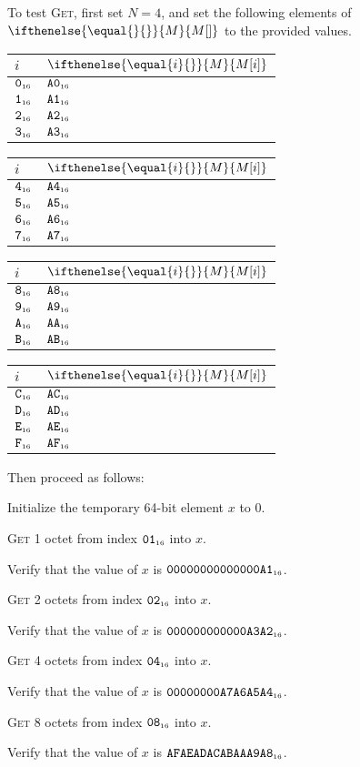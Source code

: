 \documentclass[a4paper,12pt]{article}
\makeatletter
\newcommand{\num}[1]{\texttt{#1}}
\newcommand{\hex}[1]{\num{#1}_{\textup{\tiny 16}}}
\newcommand{\MEM}[1]{\ifthenelse{\equal{#1}{}}{M}{M[#1]}}
\newcommand{\proc}[1]{\textsc{#1}}
\newenvironment{memtable}{%
  \begin{trivlist}
    \item
    }{%
    \end{trivlist}}
\newenvironment{memcolumn}{%
  \begin{tabular}{@{}ll@{}}
    $i$ & $\MEM{i}$ \\
    \hline}
    {%
    \hline
  \end{tabular}}
\newcommand{\memspace}{\qquad}
\makeatother
\begin{document}
To test \proc{Get}, first set $N=4$, and set the following elements of $\MEM{}$ to the provided values.
\begin{memtable}
  \begin{memcolumn}
    $\hex{0}$ & $\hex{A0}$ \\
    $\hex{1}$ & $\hex{A1}$ \\
    $\hex{2}$ & $\hex{A2}$ \\
    $\hex{3}$ & $\hex{A3}$ \\
  \end{memcolumn}
  \memspace
  \begin{memcolumn}
    $\hex{4}$ & $\hex{A4}$ \\
    $\hex{5}$ & $\hex{A5}$ \\
    $\hex{6}$ & $\hex{A6}$ \\
    $\hex{7}$ & $\hex{A7}$ \\
  \end{memcolumn}
  \memspace
  \begin{memcolumn}
    $\hex{8}$ & $\hex{A8}$ \\
    $\hex{9}$ & $\hex{A9}$ \\
    $\hex{A}$ & $\hex{AA}$ \\
    $\hex{B}$ & $\hex{AB}$ \\
  \end{memcolumn}
  \memspace
  \begin{memcolumn}
    $\hex{C}$ & $\hex{AC}$ \\
    $\hex{D}$ & $\hex{AD}$ \\
    $\hex{E}$ & $\hex{AE}$ \\
    $\hex{F}$ & $\hex{AF}$ \\
  \end{memcolumn}
\end{memtable}
Then proceed as follows:
\begin{stepnumbers}
\item Initialize the temporary 64-bit element $x$ to $0$.
\item \proc{Get} 1 octet  from index $\hex{01}$ into $x$.
\item Verify that the value of $x$ is $\hex{00000000000000A1}$.
\item \proc{Get} 2 octets from index $\hex{02}$ into $x$.
\item Verify that the value of $x$ is $\hex{000000000000A3A2}$.
\item \proc{Get} 4 octets from index $\hex{04}$ into $x$.
\item Verify that the value of $x$ is $\hex{00000000A7A6A5A4}$.
\item \proc{Get} 8 octets from index $\hex{08}$ into $x$.
\item Verify that the value of $x$ is $\hex{AFAEADACABAAA9A8}$.
\end{stepnumbers}
\end{document}

